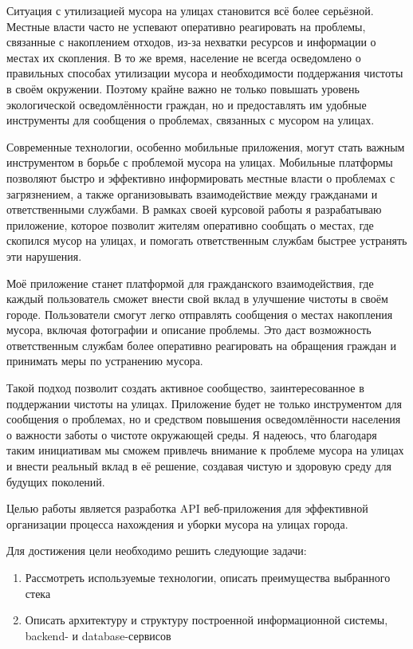 \documentclass[pract]{SCWorks}
\begin{document}
Ситуация с утилизацией мусора на улицах становится всё более серьёзной. 
Местные власти часто не успевают оперативно реагировать на проблемы, связанные 
с накоплением отходов, из-за нехватки ресурсов и информации о местах их 
скопления. В то же время, население не всегда осведомлено о правильных 
способах утилизации мусора и необходимости поддержания чистоты в своём 
окружении. Поэтому крайне важно не только повышать уровень экологической 
осведомлённости граждан, но и предоставлять им удобные инструменты для 
сообщения о проблемах, связанных с мусором на улицах.

Современные технологии, особенно мобильные приложения, могут стать важным 
инструментом в борьбе с проблемой мусора на улицах. Мобильные платформы 
позволяют быстро и эффективно информировать местные власти о проблемах с 
загрязнением, а также организовывать взаимодействие между гражданами и 
ответственными службами. В рамках своей курсовой работы я разрабатываю 
приложение, которое позволит жителям оперативно сообщать о местах, где 
скопился мусор на улицах, и помогать ответственным службам быстрее устранять 
эти нарушения.

Моё приложение станет платформой для гражданского взаимодействия, где каждый 
пользователь сможет внести свой вклад в улучшение чистоты в своём городе. 
Пользователи смогут легко отправлять сообщения о местах накопления мусора, 
включая фотографии и описание проблемы. Это даст возможность ответственным 
службам более оперативно реагировать на обращения граждан и принимать меры по 
устранению мусора.

Такой подход позволит создать активное сообщество, заинтересованное в 
поддержании чистоты на улицах. Приложение будет не только инструментом для 
сообщения о проблемах, но и средством повышения осведомлённости населения о 
важности заботы о чистоте окружающей среды. Я надеюсь, что благодаря таким 
инициативам мы сможем привлечь внимание к проблеме мусора на улицах и внести 
реальный вклад в её решение, создавая чистую и здоровую среду для будущих 
поколений.

Целью работы является разработка API веб-приложения для эффективной организации
процесса нахождения и уборки мусора на улицах города.

Для достижения цели необходимо решить следующие задачи:
\begin{enumerate}
    \item Рассмотреть используемые технологии, описать преимущества выбранного 
    стека
    \item Описать архитектуру и структуру построенной информационной системы, 
    backend- и database-сервисов
\end{enumerate}
\end{document}
